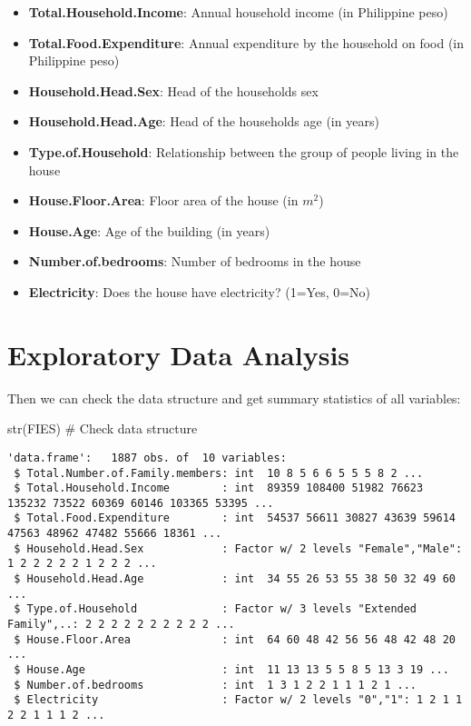 \documentclass[
]{article}
\newenvironment{Shaded}{\begin{snugshade}}{\end{snugshade}}
\newcommand{\CommentTok}[1]{\textcolor[rgb]{0.37,0.37,0.37}{#1}}
\newcommand{\FunctionTok}[1]{\textcolor[rgb]{0.28,0.35,0.67}{#1}}
\newcommand{\NormalTok}[1]{\textcolor[rgb]{0.00,0.23,0.31}{#1}}
\begin{document}
\begin{itemize}
\item
  \textbf{Total.Household.Income}: Annual household income (in
  Philippine peso)
\item
  \textbf{Total.Food.Expenditure}: Annual expenditure by the household
  on food (in Philippine peso)
\item
  \textbf{Household.Head.Sex}: Head of the households sex
\item
  \textbf{Household.Head.Age}: Head of the households age (in years)
\item
  \textbf{Type.of.Household}: Relationship between the group of people
  living in the house
\item
  \textbf{House.Floor.Area}: Floor area of the house (in \(m^2\))
\item
  \textbf{House.Age}: Age of the building (in years)
\item
  \textbf{Number.of.bedrooms}: Number of bedrooms in the house
\item
  \textbf{Electricity}: Does the house have electricity? (1=Yes, 0=No)
\end{itemize}

\hypertarget{exploratory-data-analysis}{%
\section{Exploratory Data Analysis}\label{exploratory-data-analysis}}

Then we can check the data structure and get summary statistics of all
variables:

\begin{Shaded}
\begin{Highlighting}[]
\FunctionTok{str}\NormalTok{(FIES) }\CommentTok{\# Check data structure }
\end{Highlighting}
\end{Shaded}

\begin{verbatim}
'data.frame':   1887 obs. of  10 variables:
 $ Total.Number.of.Family.members: int  10 8 5 6 6 5 5 5 8 2 ...
 $ Total.Household.Income        : int  89359 108400 51982 76623 135232 73522 60369 60146 103365 53395 ...
 $ Total.Food.Expenditure        : int  54537 56611 30827 43639 59614 47563 48962 47482 55666 18361 ...
 $ Household.Head.Sex            : Factor w/ 2 levels "Female","Male": 1 2 2 2 2 2 1 2 2 2 ...
 $ Household.Head.Age            : int  34 55 26 53 55 38 50 32 49 60 ...
 $ Type.of.Household             : Factor w/ 3 levels "Extended Family",..: 2 2 2 2 2 2 2 2 2 2 ...
 $ House.Floor.Area              : int  64 60 48 42 56 56 48 42 48 20 ...
 $ House.Age                     : int  11 13 13 5 5 8 5 13 3 19 ...
 $ Number.of.bedrooms            : int  1 3 1 2 2 1 1 1 2 1 ...
 $ Electricity                   : Factor w/ 2 levels "0","1": 1 2 1 1 2 2 1 1 1 2 ...
\end{verbatim}
\end{document}

